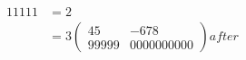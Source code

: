 \begin{align*}11111 & =2                    \\
                    & =3\begin{pmatrix}
	                        45    & -678       \\
	                        99999 & 0000000000
                        \end{pmatrix} after \\
\end{align*}
